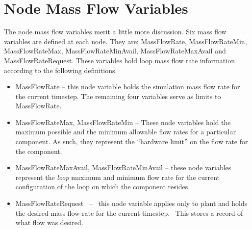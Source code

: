 \section{Node Mass Flow Variables}\label{node-mass-flow-variables}

The node mass flow variables merit a little more discussion. Six mass flow variables are defined at each node. They are: MassFlowRate, MassFlowRateMin, MassFlowRateMax, MassFlowRateMinAvail, MassFlowRateMaxAvail and MassFlowRateRequest. These variables hold loop mass flow rate information according to the following definitions.

\begin{itemize}
\item
  MassFlowRate -- this node variable holds the simulation mass flow rate for the current timestep. The remaining four variables serve as limits to MassFlowRate.
\item
  MassFlowRateMax, MassFlowRateMin -- These node variables hold the maximum possible and the minimum allowable flow rates for a particular component. As such, they represent the ``hardware limit'' on the flow rate for the component.
\item
  MassFlowRateMaxAvail, MassFlowRateMinAvail -- these node variables represent the \emph{loop} maximum and minimum flow rate for the current configuration of the loop on which the component resides.
\item
  MassFlowRateRequest~ --~ this node variable applies only to plant and holds the desired mass flow rate for the current timestep.~ This stores a record of what flow was desired.
\end{itemize}
